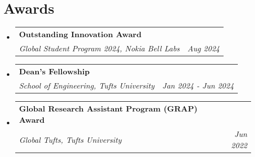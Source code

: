 \documentclass[letterpaper,11pt]{article}
\begin{document}
\newcommand{\LeaBullet}[1]
{\item\small\justifying{{\hspace{0pt}#1\vspace{0pt}}}}


\newcommand{\AwardList}{\begin{itemize}[leftmargin=0.00in]}
\newcommand{\AwardListEnd}{\end{itemize}\vspace{-5pt}}

\newcommand{\AwardHead}[4]{ %
  \vspace{0pt}\item[]
    \begin{tabular*}{1\textwidth}[t]{l@{\extracolsep{\fill}}r}
    \textbf{#1}&{\small{\textit{#2}}} \\
    \textit{#3} & \textit{\small #4}
    \end{tabular*}\vspace{-8pt}
}


\section{Awards}
\AwardList
\AwardHead{Outstanding Innovation Award}{}
{Global Student Program 2024, Nokia Bell Labs}{Aug 2024}
\AwardHead{Dean’s Fellowship}{}
{School of Engineering, Tufts University}{Jan 2024 - Jun 2024}
\AwardHead{Global Research Assistant Program (GRAP) Award}{}
{Global Tufts, Tufts University}{Jun 2022}
\AwardListEnd


  
    
\end{document}
